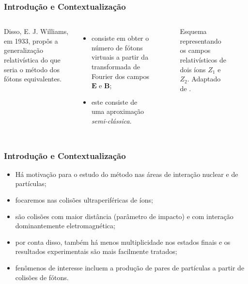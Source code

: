 \documentclass[xcolor=dvipsnames]{beamer}
\renewcommand{\vec}{\mathbf}
\begin{document}
\begin{frame}
	\frametitle{Introdução e Contextualização}
	\begin{columns}
		Disso, E. J. Williams, em 1933, propôs a generalização relativística do
		que seria o método dos fótons equivalentes.
		\begin{itemize}
			\item consiste em obter o número de fótons virtuais a partir da 
				transformada de Fourier dos campos $\vec{E}$ e $\vec{B}$;
			\item este consiste de uma aproximação \textit{semi-clássica}.
		\end{itemize}

		\begin{figure}
			
			\caption{Esquema representando os campos relativísticos de dois íons
			$Z_1$ e $Z_2$. Adaptado de \cite{bertulani2005}.}
		\end{figure}
	\end{columns}
\end{frame}

\begin{frame}
	\frametitle{Introdução e Contextualização}
	\begin{itemize}
		\item Há motivação para o estudo do método nas áreas de interação
			nuclear e de partículas;
		\item focaremos nas colisões ultraperiféricas de íons;
		\item são colisões com maior distância (parâmetro de impacto) e com
			interação dominantemente eletromagnética;
		\item por conta disso, também há menos multiplicidade nos estados
			finais e os resultados experimentais são mais facilmente tratados;
		\item fenômenos de interesse incluem a produção de pares de partículas
			a partir de colisões de fótons.
	\end{itemize}
\end{frame}
\end{document}
